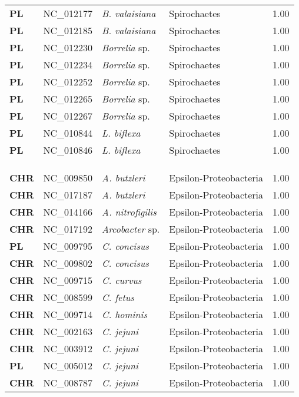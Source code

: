 \begin{adjustwidth}{-3cm}{2cm}
{\begin{supertabular}{>{\bfseries}l|p{0.1\textwidth}p{0.14\textwidth}l|l}
PL & NC\_012177 & \textit{B. valaisiana} & Spirochaetes & 1.00\\
PL & NC\_012185 & \textit{B. valaisiana} & Spirochaetes & 1.00\\
PL & NC\_012230 & \textit{Borrelia} sp. & Spirochaetes & 1.00\\
PL & NC\_012234 & \textit{Borrelia} sp. & Spirochaetes & 1.00\\
PL & NC\_012252 & \textit{Borrelia} sp. & Spirochaetes & 1.00\\
PL & NC\_012265 & \textit{Borrelia} sp. & Spirochaetes & 1.00\\
PL & NC\_012267 & \textit{Borrelia} sp. & Spirochaetes & 1.00\\
PL & NC\_010844 & \textit{L. biflexa} & Spirochaetes & 1.00\\
PL & NC\_010846 & \textit{L. biflexa} & Spirochaetes & 1.00\\
\\
\\
\hline\\
CHR & NC\_009850 & \textit{A. butzleri} & Epsilon-Proteobacteria & 1.00\\
CHR & NC\_017187 & \textit{A. butzleri} & Epsilon-Proteobacteria & 1.00\\
CHR & NC\_014166 & \textit{A. nitrofigilis} & Epsilon-Proteobacteria & 1.00\\
CHR & NC\_017192 & \textit{Arcobacter} sp. & Epsilon-Proteobacteria & 1.00\\
PL & NC\_009795 & \textit{C. concisus} & Epsilon-Proteobacteria & 1.00\\
CHR & NC\_009802 & \textit{C. concisus} & Epsilon-Proteobacteria & 1.00\\
CHR & NC\_009715 & \textit{C. curvus} & Epsilon-Proteobacteria & 1.00\\
CHR & NC\_008599 & \textit{C. fetus} & Epsilon-Proteobacteria & 1.00\\
CHR & NC\_009714 & \textit{C. hominis} & Epsilon-Proteobacteria & 1.00\\
CHR & NC\_002163 & \textit{C. jejuni} & Epsilon-Proteobacteria & 1.00\\
CHR & NC\_003912 & \textit{C. jejuni} & Epsilon-Proteobacteria & 1.00\\
PL & NC\_005012 & \textit{C. jejuni} & Epsilon-Proteobacteria & 1.00\\
CHR & NC\_008787 & \textit{C. jejuni} & Epsilon-Proteobacteria & 1.00\\

\end{supertabular}}
\end{adjustwidth}
